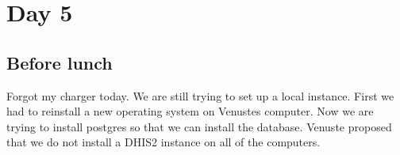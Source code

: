 \section{Day 5}
\subsection{Before lunch}
Forgot my charger today.
We are still trying to set up a local instance.
First we had to reinstall a new operating system on Venustes computer.
Now we are trying to install postgres so that we can install the database.
Venuste proposed that we do not install a DHIS2 instance on all of the computers.

